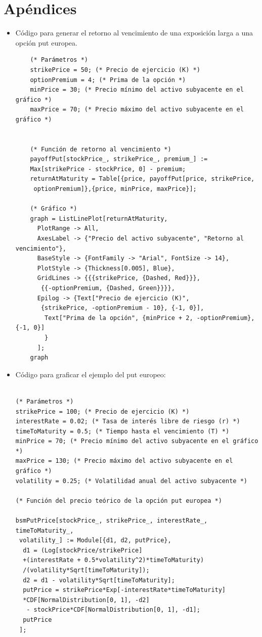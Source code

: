 \section{Apéndices}

\begin{itemize}
    \item Código para generar el retorno al vencimiento de una exposición larga a una opción put europea.
    
\begin{verbatim}
    (* Parámetros *)
    strikePrice = 50; (* Precio de ejercicio (K) *)
    optionPremium = 4; (* Prima de la opción *)
    minPrice = 30; (* Precio mínimo del activo subyacente en el gráfico *)
    maxPrice = 70; (* Precio máximo del activo subyacente en el gráfico *)
    
    
    (* Función de retorno al vencimiento *)
    payoffPut[stockPrice_, strikePrice_, premium_] := 
    Max[strikePrice - stockPrice, 0] - premium;
    returnAtMaturity = Table[{price, payoffPut[price, strikePrice,
     optionPremium]},{price, minPrice, maxPrice}];
    
    (* Gráfico *)
    graph = ListLinePlot[returnAtMaturity, 
      PlotRange -> All,
      AxesLabel -> {"Precio del activo subyacente", "Retorno al vencimiento"},
      BaseStyle -> {FontFamily -> "Arial", FontSize -> 14},
      PlotStyle -> {Thickness[0.005], Blue},
      GridLines -> {{{strikePrice, {Dashed, Red}}},
       {{-optionPremium, {Dashed, Green}}}},
      Epilog -> {Text["Precio de ejercicio (K)",
       {strikePrice, -optionPremium - 10}, {-1, 0}],
        Text["Prima de la opción", {minPrice + 2, -optionPremium}, {-1, 0}]
        }
      ];
    graph
                \end{verbatim}
    \item Código para graficar el ejemplo del put europeo:
    \begin{verbatim}

(* Parámetros *)
strikePrice = 100; (* Precio de ejercicio (K) *)
interestRate = 0.02; (* Tasa de interés libre de riesgo (r) *)
timeToMaturity = 0.5; (* Tiempo hasta el vencimiento (T) *)
minPrice = 70; (* Precio mínimo del activo subyacente en el gráfico *)
maxPrice = 130; (* Precio máximo del activo subyacente en el gráfico *)
volatility = 0.25; (* Volatilidad anual del activo subyacente *)

(* Función del precio teórico de la opción put europea *)

bsmPutPrice[stockPrice_, strikePrice_, interestRate_, timeToMaturity_,
 volatility_] := Module[{d1, d2, putPrice},
  d1 = (Log[stockPrice/strikePrice] 
  +(interestRate + 0.5*volatility^2)*timeToMaturity)
  /(volatility*Sqrt[timeToMaturity]);
  d2 = d1 - volatility*Sqrt[timeToMaturity];
  putPrice = strikePrice*Exp[-interestRate*timeToMaturity]
  *CDF[NormalDistribution[0, 1], -d2]
   - stockPrice*CDF[NormalDistribution[0, 1], -d1];
  putPrice
 ];


\end{verbatim}
\end{itemize}
